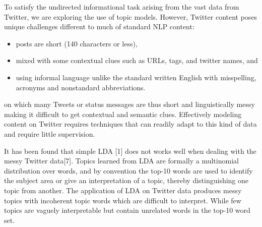 \documentclass[10pt,a5paper,twoside]{article}
\begin{document}
To satisfy the undirected informational task arising from the vast 
data from Twitter,
we are exploring the use of topic models.
However, 
Twitter content poses unique challenges different to much of standard
NLP content: 
\begin{itemize}
\item
posts are short (140 characters or less),
\item
mixed with some contextual clues such as URLs, tags, and twitter names, and
\item
using informal language unlike the standard written English
with  misspelling, acronyms and nonstandard abbreviations.
\end{itemize}
 on which many
Tweets or status messages are thus short and linguistically
messy making it difficult to get contextual and semantic clues. 
Effectively modeling content on Twitter
requires techniques that can readily adapt to this kind of data and
require little supervision.

It has been found that simple LDA [1] does not works well when dealing
with the messy Twitter data[7]. Topics learned from LDA are formally a
multinomial distribution over words, and by convention the top-10
words are used to identify the subject area or give an interpretation
of a topic, thereby distinguishing one topic from another. The
application of LDA on Twitter data produces messy topics with
incoherent topic words which are difficult to interpret. While few
topics are vaguely interpretable but contain unrelated words in the
top-10 word set.
\end{document}
